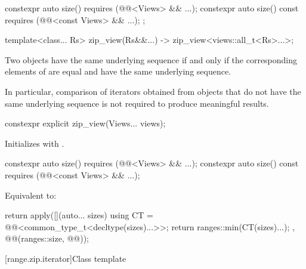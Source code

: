 \begin{codeblock}
{{    constexpr auto size() requires (@@<Views> && ...);
    constexpr auto size() const requires (@@<const Views> && ...);
  };

  template<class... Rs>
    zip_view(Rs&&...) -> zip_view<views::all_t<Rs>...>;
}
\end{codeblock}

\pnum
Two  objects have the same underlying sequence if and only if
the corresponding elements of  are equal
and have the same underlying sequence.
\begin{note}
In particular, comparison of iterators obtained from  objects
that do not have the same underlying sequence
is not required to produce meaningful results.
\end{note}

\begin{itemdecl}
constexpr explicit zip_view(Views... views);
\end{itemdecl}

\begin{itemdescr}
\pnum
\effects
Initializes  with .
\end{itemdescr}

\begin{itemdecl}
constexpr auto size() requires (@@<Views> && ...);
constexpr auto size() const requires (@@<const Views> && ...);
\end{itemdecl}

\begin{itemdescr}
\pnum
\effects
Equivalent to:
\begin{codeblock}
return apply([](auto... sizes) {
  using CT = @@<common_type_t<decltype(sizes)...>>;
  return ranges::min({CT(sizes)...});
}, @@(ranges::size, @@));
\end{codeblock}
\end{itemdescr}

[range.zip.iterator]{Class template }

